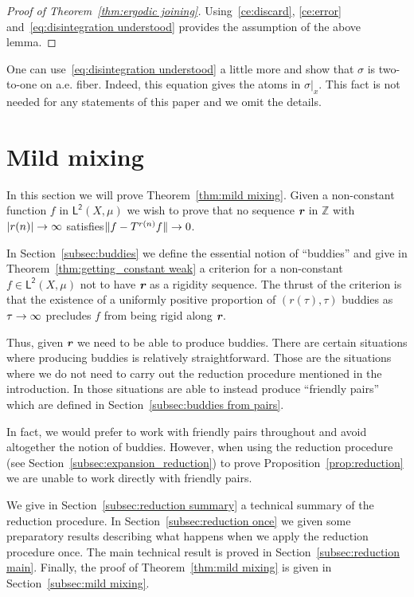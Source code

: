 \documentclass[AHL,Unicode,longabstracts,published]{cedram}
\newcommand{\Z}{\mathbb{Z}}
\newcommand{\lp}{\mathsf{L}}
\newcommand{\ltwo}{\lp^{\!\mathsf{2}}}
\def\mathbi#1{\textbf{\em #1}}
\newcommand{\bir}{\mathbi{r}}
\renewcommand*{\to}{\mathchoice{\longrightarrow}{\rightarrow}{\rightarrow}{\rightarrow}}
\begin{document}
\begin{proof}[Proof of Theorem~\ref{thm:ergodic joining}]
Using~\eqref{ce:discard}, \eqref{ce:error} and~\eqref{eq:disintegration understood} provides the assumption of the above lemma.
\end{proof}

\begin{rema}
One can use~\eqref{eq:disintegration understood} a little more and show that $\sigma$ is two-to-one on a.e. fiber. Indeed, this equation gives the atoms in $\sigma|_x$. This fact is not needed for any statements of this paper and we omit the details.
\end{rema}



\section{Mild mixing}\label{sec:mild mixing}

In this section we will prove Theorem~\ref{thm:mild mixing}. Given a non-constant function $f$ in $\ltwo(X,\mu)$ we wish to prove that no sequence $\bir$ in $\Z$ with $|r(n)| \to \infty$ satisfies\linebreak $\| f - T^{r(n)} f \| \to 0$.

In Section~\ref{subsec:buddies} we define the essential notion of ``buddies'' and give in Theorem~\ref{thm:getting_constant weak} a criterion for a non-constant $f \in \ltwo(X,\mu)$ not to have $\bir$ as a rigidity sequence. The thrust of the criterion is that the existence of a uniformly positive proportion of $(r(\tau),\tau)$ buddies as $\tau \to
\infty$ precludes $f$ from being rigid along $\bir$.

Thus, given $\bir$ we need to be able to produce buddies. There are certain situations where producing buddies is relatively straightforward. Those are the situations where we do not need to carry out the reduction procedure mentioned in the introduction. In those situations are able to instead produce ``friendly pairs'' which are defined in Section~\ref{subsec:buddies from pairs}.

In fact, we would prefer to work with friendly pairs throughout and avoid altogether the notion of buddies. However, when using the reduction procedure (see Section~\ref{subsec:expansion_reduction}) to prove Proposition~\ref{prop:reduction} we are unable to work directly with friendly pairs.

We give in Section~\ref{subsec:reduction summary} a technical summary of the reduction procedure. In Section~\ref{subsec:reduction once} we given some preparatory results describing what happens when we apply the reduction procedure once. The main technical result is proved in Section~\ref{subsec:reduction main}. Finally, the proof of Theorem~\ref{thm:mild mixing} is given in Section~\ref{subsec:mild mixing}.
\end{document}
